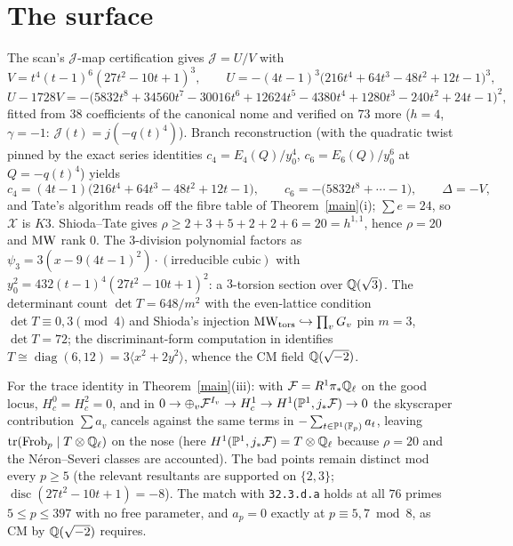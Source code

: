 \documentclass[11pt]{amsart}
\theoremstyle{remark}
\begin{document}
\section{The surface}
The scan's $\mathcal J$-map certification gives $\mathcal J=U/V$ with
\[V=t^4(t-1)^6(27t^2-10t+1)^3,\qquad U=-(4t-1)^3\bigl(216t^4+64t^3-48t^2+12t-1\bigr)^3,\]
\[U-1728V=-\bigl(5832t^8+34560t^7-30016t^6+12624t^5-4380t^4+1280t^3-240t^2+24t-1\bigr)^2,\]
fitted from $38$ coefficients of the canonical nome and verified on $73$ more ($h=4$, $\gamma=-1$: $\mathcal J(t)=j(-q(t)^4)$). Branch reconstruction (with the quadratic twist pinned by the exact series identities $c_4=E_4(Q)/y_0^4$, $c_6=E_6(Q)/y_0^6$ at $Q=-q(t)^4$) yields
\[c_4=(4t-1)\bigl(216t^4+64t^3-48t^2+12t-1\bigr),\qquad c_6=-\bigl(5832t^8+\cdots-1\bigr),\qquad \Delta=-V,\]
and Tate's algorithm reads off the fibre table of Theorem~\ref{main}(i); $\sum e=24$, so $\mathcal X$ is $K3$. Shioda--Tate gives $\rho\ge2+3+5+2+2+6=20=h^{1,1}$, hence $\rho=20$ and $\operatorname{MW}$ rank $0$. The $3$-division polynomial factors as $\psi_3=3(x-9(4t-1)^2)\cdot(\text{irreducible cubic})$ with $y_0^2=432(t-1)^4(27t^2-10t+1)^2$: a $3$-torsion section over $\mathbb Q(\sqrt3)$. The determinant count $\det T=648/m^2$ with the even-lattice condition $\det T\equiv0,3\pmod4$ and Shioda's injection $\operatorname{MW}_{\rm tors}\hookrightarrow\prod_vG_v$ pin $m=3$, $\det T=72$; the discriminant-form computation in \cite{K3P} identifies $T\cong\operatorname{diag}(6,12)=3\langle x^2+2y^2\rangle$, whence the CM field $\mathbb Q(\sqrt{-2})$.

For the trace identity in Theorem~\ref{main}(iii): with $\mathcal F=R^1\pi_*\mathbb Q_\ell$ on the good locus, $H^0_c=H^2_c=0$, and in $0\to\oplus_v\mathcal F^{I_v}\to H^1_c\to H^1(\mathbb P^1,j_*\mathcal F)\to0$ the skyscraper contribution $\sum a_v$ cancels against the same terms in $-\sum_{t\in\mathbb P^1(\mathbb F_p)}a_t$, leaving $\operatorname{tr}(\mathrm{Frob}_p\mid T\otimes\mathbb Q_\ell)$ on the nose (here $H^1(\mathbb P^1,j_*\mathcal F)=T\otimes\mathbb Q_\ell$ because $\rho=20$ and the N\'eron--Severi classes are accounted). The bad points remain distinct mod every $p\ge5$ (the relevant resultants are supported on $\{2,3\}$; $\operatorname{disc}(27t^2-10t+1)=-8$). The match with \texttt{32.3.d.a} holds at all $76$ primes $5\le p\le397$ with no free parameter, and $a_p=0$ exactly at $p\equiv5,7\bmod8$, as CM by $\mathbb Q(\sqrt{-2})$ requires.
\end{document}
